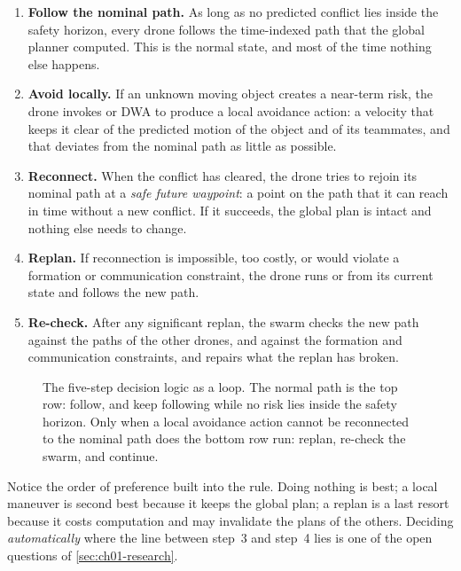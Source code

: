 \begin{enumerate}
  \item \textbf{Follow the nominal path.} As long as no predicted conflict lies
        inside the safety horizon, every drone follows the time-indexed path that the
        global planner computed. This is the normal state, and most of the time nothing
        else happens.
  \item \textbf{Avoid locally.} If an unknown moving object creates a near-term
        risk, the drone invokes \orca or DWA to produce a local avoidance action: a
        velocity that keeps it clear of the predicted motion of the object and of its
        teammates, and that deviates from the nominal path as little as possible.
  \item \textbf{Reconnect.} When the conflict has cleared, the drone tries to rejoin
        its nominal path at a \emph{safe future waypoint}: a point on the path that it
        can reach in time without a new conflict. If it succeeds, the global plan is
        intact and nothing else needs to change.
  \item \textbf{Replan.} If reconnection is impossible, too costly, or would violate a
        formation or communication constraint, the drone runs \dstarlite or \astar
        from its current state and follows the new path.
  \item \textbf{Re-check.} After any significant replan, the swarm checks the new path
        against the paths of the other drones, and against the formation and
        communication constraints, and repairs what the replan has broken.
\end{enumerate}

\begin{figure}[tb]
  \centering
  \caption{The five-step decision logic as a loop. The normal path is the top row:
    follow, and keep following while no risk lies inside the safety horizon. Only
    when a local avoidance action cannot be reconnected to the nominal path does the
    bottom row run: replan, re-check the swarm, and continue.}
  \label{fig:ch01-decision}
\end{figure}

Notice the order of preference built into the rule. Doing nothing is best; a local
maneuver is second best because it keeps the global plan; a replan is a last resort
because it costs computation and may invalidate the plans of the others. Deciding
\emph{automatically} where the line between step~3 and step~4 lies is one of the open
questions of \cref{sec:ch01-research}.

